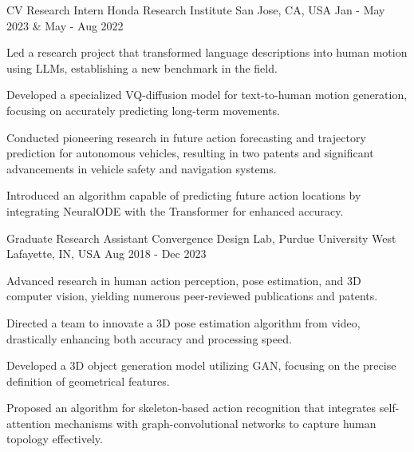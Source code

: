 \begin{cventries}
\cventry
{CV Research Intern} %
{Honda Research Institute} %
{San Jose, CA, USA} %
{Jan - May 2023 \& May - Aug 2022} %
{ %
\begin{cvitems}
    \item Led a research project that transformed language descriptions into human motion using LLMs, establishing a new benchmark in the field.
    \item Developed a specialized VQ-diffusion model for text-to-human motion generation, focusing on accurately predicting long-term movements.
    \item Conducted pioneering research in future action forecasting and trajectory prediction for autonomous vehicles, resulting in two patents and significant advancements in vehicle safety and navigation systems.
    \item Introduced an algorithm capable of predicting future action locations by integrating NeuralODE with the Transformer for enhanced accuracy.
\end{cvitems}
}

\cventry
{Graduate Research Assistant} %
{Convergence Design Lab, Purdue University} %
{West Lafayette, IN, USA} %
{Aug 2018 - Dec 2023} %
{ %
\begin{cvitems}
    \item Advanced research in human action perception, pose estimation, and 3D computer vision, yielding numerous peer-reviewed publications and patents.
    \item Directed a team to innovate a 3D pose estimation algorithm from video, drastically enhancing both accuracy and processing speed.
    \item Developed a 3D object generation model utilizing GAN, focusing on the precise definition of geometrical features.
    \item Proposed an algorithm for skeleton-based action recognition that integrates self-attention mechanisms with graph-convolutional networks to capture human topology effectively.
\end{cvitems}
}


\end{cventries}
